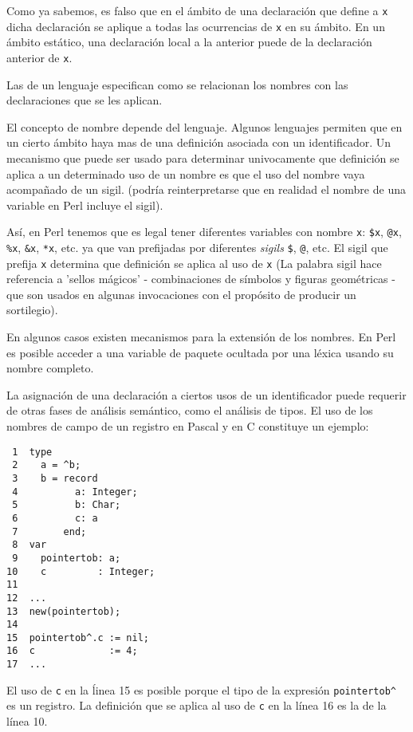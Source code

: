 
Como ya sabemos, es falso que en el ámbito de una declaración que define a \verb|x| 
dicha declaración se aplique a todas las ocurrencias de \verb|x| en su ámbito.
En un ámbito estático, una declaración local a la anterior puede  de 
la declaración anterior de \verb|x|.

\begin{definition}
Las  de un lenguaje especifican como se relacionan los nombres
con las declaraciones que se les aplican.
\end{definition}

El concepto de nombre depende del lenguaje. 
Algunos lenguajes permiten que en un cierto ámbito haya mas de una definición asociada 
con un identificador.  Un mecanismo que puede ser usado para determinar univocamente que definición
se aplica a un determinado uso de un nombre es que el uso del nombre vaya acompañado
de un sigil.
(podría reinterpretarse que en realidad el nombre de una variable en Perl incluye el sigil).

Así, en Perl tenemos que es 
legal tener diferentes variables con nombre \verb|x|: \verb|$x|, \verb|@x|, \verb|%x|, \verb|&x|, \verb|*x|,
etc. ya que van prefijadas por diferentes \emph{sigils} 
\verb|$|, \verb|@|, etc. El sigil que prefija \verb|x| determina que definición se aplica al uso de \verb|x|
(La palabra sigil hace referencia a 'sellos mágicos' - combinaciones de símbolos 
y figuras geométricas - que son usados en algunas invocaciones con el propósito de producir un
sortilegio).

En algunos casos existen mecanismos para la
extensión de los nombres.
En Perl es posible acceder a una variable de paquete
ocultada por una léxica usando su nombre completo.

La asignación de una declaración a ciertos usos de un identificador puede requerir
de otras fases de análisis semántico, como el análisis de tipos.
El uso de los nombres de campo de un registro en  Pascal y en C 
constituye un ejemplo:

\begin{verbatim}
 1	type 
 2	  a = ^b;
 3	  b = record
 4	        a: Integer;
 5	        b: Char;
 6	        c: a
 7	      end;
 8	var
 9	  pointertob: a;
10	  c         : Integer;
11	
12	...
13	new(pointertob);
14	
15	pointertob^.c := nil;
16	c             := 4;
17	...
\end{verbatim}

El uso de \verb|c| en la ĺinea 15 es posible porque el tipo de la expresión \verb|pointertob^|
es un registro. La definición que se aplica al uso de \verb|c| en la línea 16 es la de la línea 10.

